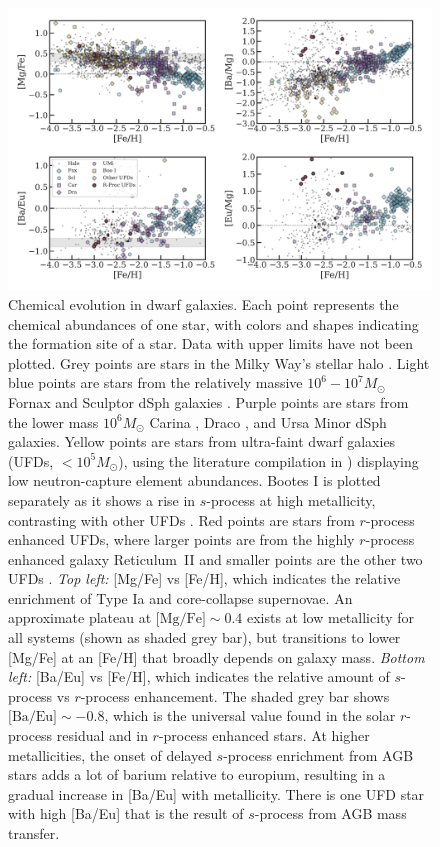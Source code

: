 \documentclass[letterpaper]{article}
\begin{document}
\begin{figure}
    \centering
    \includegraphics[width=0.95\linewidth]{figures/chemevol_xfe.pdf}
    \caption{Chemical evolution in dwarf galaxies.
    Each point represents the chemical abundances of one star, with colors and shapes indicating the formation site of a star. Data with upper limits have not been plotted.
    Grey points are stars in the Milky Way's stellar halo \citep{Abohalima18}.
    Light blue points are stars from the relatively massive $10^6-10^7 M_\odot$ Fornax and Sculptor dSph galaxies \citep{Letarte2010,Hill2019}.
    Purple points are stars from the lower mass $10^6 M_\odot$ Carina \citep{Venn2012,Lemasle2012,Norris2017}, Draco \citep{Cohen2009,Tsujimoto2017}, and Ursa Minor \citep{Cohen2010,Kirby2012,Ural2015} dSph galaxies.
    Yellow points are stars from ultra-faint dwarf galaxies (UFDs, $<10^5 M_\odot$), using the literature compilation in \citealt{Ji2020}) displaying low neutron-capture element abundances. Bootes I is plotted separately as it shows a rise in $s$-process at high metallicity, contrasting with other UFDs \citep{Frebel16}.
    Red points are stars from $r$-process enhanced UFDs, where larger points are from the highly $r$-process enhanced galaxy Reticulum~II and smaller points are the other two UFDs \citep{Ji2016c,Marshall2019,Hansen2021}.
    \emph{Top left:} [Mg/Fe] vs [Fe/H], which indicates the relative enrichment of Type Ia and core-collapse supernovae. An approximate plateau at $\mbox{[Mg/Fe]} \sim 0.4$ exists at low metallicity for all systems (shown as shaded grey bar), but transitions to lower [Mg/Fe] at an [Fe/H] that broadly depends on galaxy mass.
    \emph{Bottom left:} [Ba/Eu] vs [Fe/H], which indicates the relative amount of $s$-process vs $r$-process enhancement. The shaded grey bar shows $\mbox{[Ba/Eu]} \sim -0.8$, which is the universal value found in the solar $r$-process residual and in $r$-process enhanced stars. At higher metallicities, the onset of delayed $s$-process enrichment from AGB stars adds a lot of barium relative to europium, resulting in a gradual increase in [Ba/Eu] with metallicity. There is one UFD star with high [Ba/Eu] that is the result of $s$-process from AGB mass transfer.
}
\end{figure}
\end{document}
